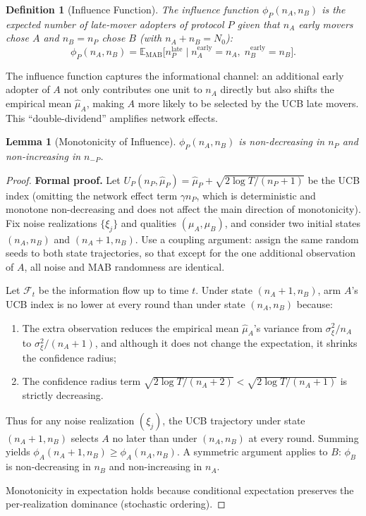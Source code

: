 \documentclass[12pt,a4paper]{article}
\newtheorem{lemma}[theorem]{Lemma}
\newtheorem{definition}[theorem]{Definition}
\newcommand{\E}{\mathbb{E}}
\begin{document}
\begin{definition}[Influence Function]
\label{def:influence}
The \emph{influence function} $\phi_P(n_A,n_B)$ is the expected number of
late-mover adopters of protocol $P$ given that $n_A$ early movers chose $A$
and $n_B=n_P$ chose $B$ (with $n_A+n_B=N_0$):
\begin{equation}\label{eq:influence}
    \phi_P(n_A,n_B) = \E_{\text{MAB}}\!\big[n_P^{\text{late}} \mid
    n_A^{\text{early}}=n_A,\; n_B^{\text{early}}=n_B\big].
\end{equation}
\end{definition}

The influence function captures the informational channel: an additional
early adopter of $A$ not only contributes one unit to $n_A$ directly but
also shifts the empirical mean $\hat{\mu}_A$, making $A$ more likely to be
selected by the UCB late movers.  This ``double-dividend'' amplifies
network effects.

\begin{lemma}[Monotonicity of Influence]
\label{lem:influence-monotone}
$\phi_P(n_A,n_B)$ is non-decreasing in $n_P$ and non-increasing in
$n_{-P}$.
\end{lemma}

\begin{proof}
\textbf{Formal proof.}
Let $U_P(n_P, \hat{\mu}_P) = \hat{\mu}_P + \sqrt{2\log T/(n_P+1)}$ be the UCB index
(omitting the network effect term $\gamma n_P$, which is deterministic and monotone non-decreasing and does not affect the main direction of monotonicity).
Fix noise realizations $\{\xi_j\}$ and qualities $(\mu_A,\mu_B)$, and consider two initial states
$(n_A, n_B)$ and $(n_A+1, n_B)$. Use a coupling argument: assign the same random seeds to both state trajectories, so that except for the one additional observation of $A$, all noise and MAB randomness are identical.

Let $\mathcal{F}_t$ be the information flow up to time $t$. Under state $(n_A+1, n_B)$,
arm $A$'s UCB index is no lower at every round than under state $(n_A, n_B)$ because:
\begin{enumerate}
  \item The extra observation reduces the empirical mean $\hat{\mu}_A$'s variance from $\sigma_\xi^2/n_A$ to
        $\sigma_\xi^2/(n_A+1)$, and although it does not change the expectation, it shrinks the confidence radius;
  \item The confidence radius term $\sqrt{2\log T/(n_A+2)} < \sqrt{2\log T/(n_A+1)}$ is strictly decreasing.
\end{enumerate}
Thus for any noise realization $(\xi_j)$, the UCB trajectory under state $(n_A+1, n_B)$ selects $A$ no later than under $(n_A, n_B)$ at every round. Summing yields
$\phi_A(n_A+1, n_B) \geq \phi_A(n_A, n_B)$. A symmetric argument applies to $B$:
$\phi_B$ is non-decreasing in $n_B$ and non-increasing in $n_A$.

Monotonicity in expectation holds because conditional expectation preserves the per-realization dominance (stochastic ordering).
\end{proof}
\end{document}
